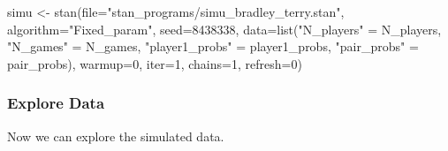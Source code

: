 \documentclass[
  letterpaper,
  DIV=11,
  numbers=noendperiod]{scrartcl}
\newenvironment{Shaded}{\begin{snugshade}}{\end{snugshade}}
\newcommand{\AttributeTok}[1]{\textcolor[rgb]{0.40,0.45,0.13}{#1}}
\newcommand{\DecValTok}[1]{\textcolor[rgb]{0.68,0.00,0.00}{#1}}
\newcommand{\FunctionTok}[1]{\textcolor[rgb]{0.28,0.35,0.67}{#1}}
\newcommand{\NormalTok}[1]{\textcolor[rgb]{0.00,0.23,0.31}{#1}}
\newcommand{\OtherTok}[1]{\textcolor[rgb]{0.00,0.23,0.31}{#1}}
\newcommand{\SpecialCharTok}[1]{\textcolor[rgb]{0.37,0.37,0.37}{#1}}
\newcommand{\StringTok}[1]{\textcolor[rgb]{0.13,0.47,0.30}{#1}}
\begin{document}
\begin{Shaded}
\begin{Highlighting}[]
\NormalTok{simu }\OtherTok{\textless{}{-}} \FunctionTok{stan}\NormalTok{(}\AttributeTok{file=}\StringTok{"stan\_programs/simu\_bradley\_terry.stan"}\NormalTok{,}
             \AttributeTok{algorithm=}\StringTok{"Fixed\_param"}\NormalTok{, }\AttributeTok{seed=}\DecValTok{8438338}\NormalTok{,}
             \AttributeTok{data=}\FunctionTok{list}\NormalTok{(}\StringTok{"N\_players"} \OtherTok{=}\NormalTok{ N\_players,}
                       \StringTok{"N\_games"} \OtherTok{=}\NormalTok{ N\_games,}
                       \StringTok{"player1\_probs"} \OtherTok{=}\NormalTok{ player1\_probs,}
                       \StringTok{"pair\_probs"} \OtherTok{=}\NormalTok{ pair\_probs),}
             \AttributeTok{warmup=}\DecValTok{0}\NormalTok{, }\AttributeTok{iter=}\DecValTok{1}\NormalTok{, }\AttributeTok{chains=}\DecValTok{1}\NormalTok{, }\AttributeTok{refresh=}\DecValTok{0}\NormalTok{)}
\end{Highlighting}
\end{Shaded}

\begin{Shaded}
\end{Shaded}

\subsubsection{Explore Data}\label{explore-data}

Now we can explore the simulated data.
\end{document}
